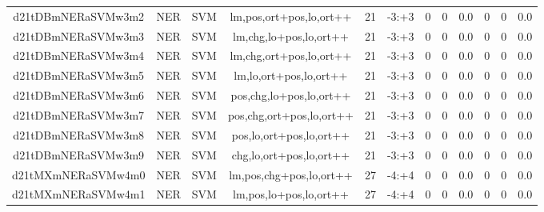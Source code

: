 \documentclass[a4paper]{article}
\begin{document}
\begin{landscape}
\begin{center}
\begin{tabular}{ |c|c|c|c|c|c|c|c|c|c|c|c|}
 
 	
 	\small{ d21tDBmNERaSVMw3m2 } & \small{ NER} & \small{  SVM }  & lm,pos,ort+pos,lo,ort++  &  21 &  \small{  -3:+3 }  &  0 & 0 & 0.0  &  0 & 0 & 0.0 \\
 	

 
 	
 	\small{ d21tDBmNERaSVMw3m3 } & \small{ NER} & \small{  SVM }  & lm,chg,lo+pos,lo,ort++  &  21 &  \small{  -3:+3 }  &  0 & 0 & 0.0  &  0 & 0 & 0.0 \\
 	

 
 	
 	\small{ d21tDBmNERaSVMw3m4 } & \small{ NER} & \small{  SVM }  & lm,chg,ort+pos,lo,ort++  &  21 &  \small{  -3:+3 }  &  0 & 0 & 0.0  &  0 & 0 & 0.0 \\
 	

 
 	
 	\small{ d21tDBmNERaSVMw3m5 } & \small{ NER} & \small{  SVM }  & lm,lo,ort+pos,lo,ort++  &  21 &  \small{  -3:+3 }  &  0 & 0 & 0.0  &  0 & 0 & 0.0 \\
 	

 
 	
 	\small{ d21tDBmNERaSVMw3m6 } & \small{ NER} & \small{  SVM }  & pos,chg,lo+pos,lo,ort++  &  21 &  \small{  -3:+3 }  &  0 & 0 & 0.0  &  0 & 0 & 0.0 \\
 	

 
 	
 	\small{ d21tDBmNERaSVMw3m7 } & \small{ NER} & \small{  SVM }  & pos,chg,ort+pos,lo,ort++  &  21 &  \small{  -3:+3 }  &  0 & 0 & 0.0  &  0 & 0 & 0.0 \\
 	

 
 	
 	\small{ d21tDBmNERaSVMw3m8 } & \small{ NER} & \small{  SVM }  & pos,lo,ort+pos,lo,ort++  &  21 &  \small{  -3:+3 }  &  0 & 0 & 0.0  &  0 & 0 & 0.0 \\
 	

 
 	
 	\small{ d21tDBmNERaSVMw3m9 } & \small{ NER} & \small{  SVM }  & chg,lo,ort+pos,lo,ort++  &  21 &  \small{  -3:+3 }  &  0 & 0 & 0.0  &  0 & 0 & 0.0 \\
 	

 
 	
 	\small{ d21tMXmNERaSVMw4m0 } & \small{ NER} & \small{  SVM }  & lm,pos,chg+pos,lo,ort++  &  27 &  \small{  -4:+4 }  &  0 & 0 & 0.0  &  0 & 0 & 0.0 \\
 	

 
 	
 	\small{ d21tMXmNERaSVMw4m1 } & \small{ NER} & \small{  SVM }  & lm,pos,lo+pos,lo,ort++  &  27 &  \small{  -4:+4 }  &  0 & 0 & 0.0  &  0 & 0 & 0.0 \\
 	


\end{tabular}
\end{center}
\end{landscape}
\end{document}
